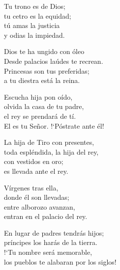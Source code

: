 \documentclass[12pt, letterpaper]{report}
\begin{document}
    \noindent
    Tu trono es de Dios;\\
    tu cetro es la equidad;\\
    t\'u amas la justicia\\
    y odias la impiedad.

    \noindent
    Dios te ha ungido con \'oleo\\
    Desde palacios la\'udes te recrean.\\
    Princesas son tus preferidas;\\
    a tu diestra est\'a la reina.

    \noindent
    Escucha hija pon o\'ido,\\
    olvida la casa de tu padre,\\
    el rey se prendar\'a de t\'i.\\
    El es tu Se\~nor. !`P\'ostrate ante \'el!

    \noindent
    La hija de Tiro con presentes,\\
    toda espl\'endida, la hija del rey,\\
    con vestidos en oro;\\
    es llevada ante el rey.

    \noindent
    V\'irgenes tras ella,\\
    donde \'el son llevadas;\\
    entre alborozo avanzan,\\
    entran en el palacio del rey.

    \noindent
    En lugar de padres tendr\'as hijos;\\
    pr\'incipes los har\'as de la tierra.\\
    !`Tu nombre ser\'a memorable,\\
    los pueblos te alabaran por los siglos!
    \clearpage

    {%
\parindent 0pt
\noindent
\ifx\preLilyPondExample \undefined
\else
  \expandafter\preLilyPondExample
\fi
\def\lilypondbook{}%
%
\ifx\postLilyPondExample \undefined
\else
  \expandafter\postLilyPondExample
\fi
}
    \clearpage

    {%
\parindent 0pt
\noindent
\ifx\preLilyPondExample \undefined
\else
  \expandafter\preLilyPondExample
\fi
\def\lilypondbook{}%
%
\ifx\postLilyPondExample \undefined
\else
  \expandafter\postLilyPondExample
\fi
}
    \clearpage

    {%
\parindent 0pt
\noindent
\ifx\preLilyPondExample \undefined
\else
  \expandafter\preLilyPondExample
\fi
\def\lilypondbook{}%
%
\ifx\postLilyPondExample \undefined
\else
  \expandafter\postLilyPondExample
\fi
}
    \clearpage

\end{document}
